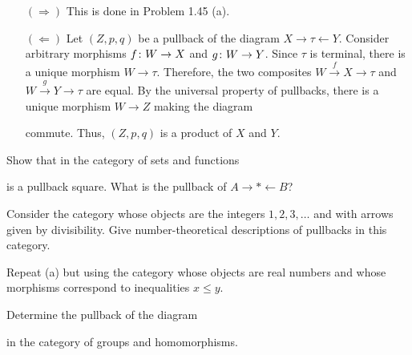 \bs
\begin{itemize}
\item[$(\Rightarrow)$]
This is done in Problem 1.45 (a).
\item[$(\Leftarrow)$]
Let $(Z,p,q)$ be a pullback of the diagram $X\to\tau\leftarrow Y$. Consider arbitrary morphisms $f\colon W\to X$ and $g\colon W\to Y$. Since $\tau$ is terminal, there is a unique morphism $W\to \tau$. Therefore, the two composites $W\xrightarrow{\,f\,}X\to \tau$ and $W\xrightarrow{\,g\,}Y\to \tau$ are equal. By the universal property of pullbacks, there is a unique morphism $W\to Z$ making the diagram 
\bse
{}
\ese
commute. Thus, $(Z,p,q)$ is a product of $X$ and $Y$. 
\end{itemize}
\es

\bp
Show that in the category of sets and functions
\bse
{}
\ese
is a pullback square. What is the pullback of $A \to * \leftarrow B$?
\ep

\bs
\es

\bx
\ben[label=(\alph*)]
\item Consider the category whose objects are the integers $1, 2, 3, \ldots$ and with arrows given by divisibility. Give number-theoretical descriptions of pullbacks in this category.
\item Repeat (a) but using the category whose objects are real numbers and whose morphisms correspond to inequalities $x \leq y$.
\een
\ex

\bs
\ben[label=(\alph*)]
\item 
\item 
\een
\es

\bx
Determine the pullback of the diagram
\bse
{}
\ese
in the category of groups and homomorphisms.
\ex

